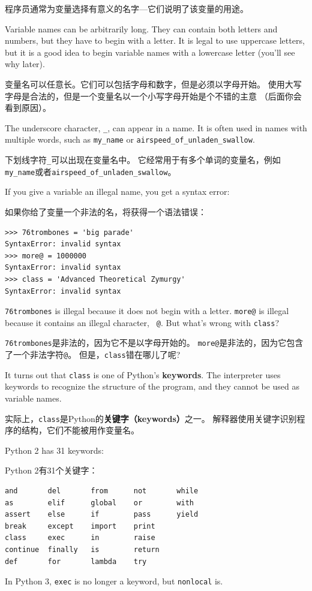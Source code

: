 \documentclass[10pt]{book}
\begin{document}
\begin{CJK}{UTF8}{gbsn}
程序员通常为变量选择有意义的名字---它们说明了该变量的用途。

Variable names can be arbitrarily long.  They can contain
both letters and numbers, but they have to begin with a letter.
It is legal to use uppercase letters, but it is a good idea
to begin variable names with a lowercase letter (you'll
see why later).

变量名可以任意长。它们可以包括字母和数字，但是必须以字母开始。
使用大写字母是合法的，但是一个变量名以一个小写字母开始是个不错的主意
（后面你会看到原因）。

The underscore character, \verb"_", can appear in a name.
It is often used in names with multiple words, such as
\verb"my_name" or \verb"airspeed_of_unladen_swallow".

下划线字符\verb"_"可以出现在变量名中。
它经常用于有多个单词的变量名，例如\verb"my_name"或者\verb"airspeed_of_unladen_swallow"。

If you give a variable an illegal name, you get a syntax error:

如果你给了变量一个非法的名，将获得一个语法错误：

\begin{verbatim}
>>> 76trombones = 'big parade'
SyntaxError: invalid syntax
>>> more@ = 1000000
SyntaxError: invalid syntax
>>> class = 'Advanced Theoretical Zymurgy'
SyntaxError: invalid syntax
\end{verbatim}
%
{\tt 76trombones} is illegal because it does not begin with a letter.
{\tt more@} is illegal because it contains an illegal character, {\tt
@}.  But what's wrong with {\tt class}?

{\tt 76trombones}是非法的，因为它不是以字母开始的。
{\tt more@}是非法的，因为它包含了一个非法字符{\tt @}。
但是，{\tt class}错在哪儿了呢?

It turns out that {\tt class} is one of Python's {\bf keywords}.  The
interpreter uses keywords to recognize the structure of the program,
and they cannot be used as variable names.

实际上，{\tt class}是Python的{\bf 关键字（keywords）}之一。
解释器使用关键字识别程序的结构，它们不能被用作变量名。

Python 2 has 31 keywords:

Python 2有31个关键字：

\begin{verbatim}
and       del       from      not       while    
as        elif      global    or        with     
assert    else      if        pass      yield    
break     except    import    print              
class     exec      in        raise              
continue  finally   is        return             
def       for       lambda    try
\end{verbatim}
%
In Python 3, {\tt exec} is no longer a keyword, but {\tt nonlocal} is.


\end{CJK}
\end{document}
